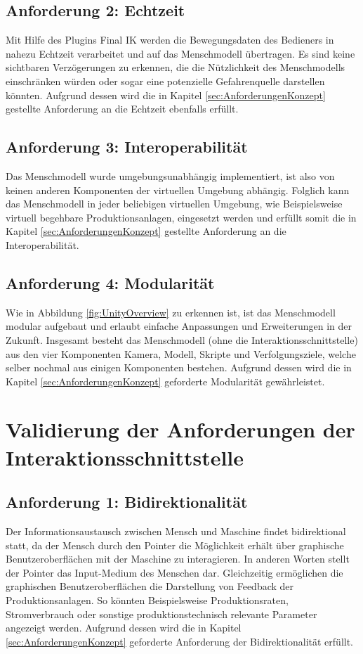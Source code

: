 \subsection{Anforderung 2: Echtzeit}
Mit Hilfe des Plugins Final IK werden die Bewegungsdaten des Bedieners in nahezu Echtzeit verarbeitet und auf das Menschmodell übertragen. Es sind keine sichtbaren Verzögerungen zu erkennen, die die Nützlichkeit des Menschmodells einschränken würden oder sogar eine potenzielle Gefahrenquelle darstellen könnten. Aufgrund dessen wird die in Kapitel \ref{sec:AnforderungenKonzept} gestellte Anforderung an die Echtzeit ebenfalls erfüllt.

\subsection{Anforderung 3: Interoperabilität}
Das Menschmodell wurde umgebungsunabhängig implementiert, ist also von keinen anderen Komponenten der virtuellen Umgebung abhängig. Folglich kann das Menschmodell in jeder beliebigen virtuellen Umgebung, wie Beispielsweise virtuell begehbare Produktionsanlagen, eingesetzt werden und erfüllt somit die in Kapitel \ref{sec:AnforderungenKonzept} gestellte Anforderung an die Interoperabilität.

\subsection{Anforderung 4: Modularität}
Wie in Abbildung \ref{fig:UnityOverview} zu erkennen ist, ist das Menschmodell modular aufgebaut und erlaubt einfache Anpassungen und Erweiterungen in der Zukunft. Insgesamt besteht das Menschmodell (ohne die Interaktionsschnittstelle) aus den vier Komponenten Kamera, Modell, Skripte und Verfolgungsziele, welche selber nochmal aus einigen Komponenten bestehen. Aufgrund dessen wird die in Kapitel \ref{sec:AnforderungenKonzept} geforderte Modularität gewährleistet.

\section{Validierung der Anforderungen der Interaktionsschnittstelle}\label{sec:ValidInteraktion}

\subsection{Anforderung 1: Bidirektionalität}
Der Informationsaustausch zwischen Mensch und Maschine findet bidirektional statt, da der Mensch durch den Pointer die Möglichkeit erhält über graphische Benutzeroberflächen mit der Maschine zu interagieren. In anderen Worten stellt der Pointer das Input-Medium des Menschen dar. Gleichzeitig ermöglichen die graphischen Benutzeroberflächen die Darstellung von Feedback der Produktionsanlagen. So könnten Beispielsweise Produktionsraten, Stromverbrauch oder sonstige produktionstechnisch relevante Parameter angezeigt werden. Aufgrund dessen wird die in Kapitel \ref{sec:AnforderungenKonzept} geforderte Anforderung der Bidirektionalität erfüllt.


